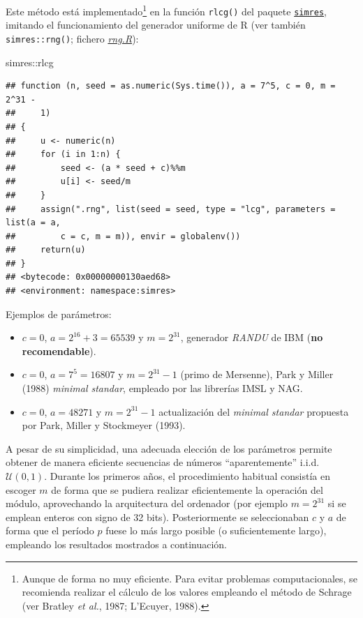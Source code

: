\documentclass[
]{book}
\newenvironment{Shaded}{\begin{snugshade}}{\end{snugshade}}
\newcommand{\NormalTok}[1]{#1}
\newcommand{\SpecialCharTok}[1]{\textcolor[rgb]{0.00,0.00,0.00}{#1}}
\theoremstyle{break}
\theoremstyle{nonumberplain}
\begin{document}
Este método está implementado\footnote{Aunque de forma no muy eficiente. Para evitar problemas computacionales, se recomienda realizar el cálculo de los valores empleando el método de Schrage (ver Bratley \emph{et al.}, 1987; L'Ecuyer, 1988).} en la función \texttt{rlcg()} del paquete \href{https://rubenfcasal.github.io/simres}{\texttt{simres}}, imitando el funcionamiento del generador uniforme de R (ver también \texttt{simres::rng()}; fichero \href{R/rng.R}{\emph{rng.R}}):

\begin{Shaded}
\begin{Highlighting}[]
\NormalTok{simres}\SpecialCharTok{::}\NormalTok{rlcg}
\end{Highlighting}
\end{Shaded}

\begin{verbatim}
## function (n, seed = as.numeric(Sys.time()), a = 7^5, c = 0, m = 2^31 - 
##     1) 
## {
##     u <- numeric(n)
##     for (i in 1:n) {
##         seed <- (a * seed + c)%%m
##         u[i] <- seed/m
##     }
##     assign(".rng", list(seed = seed, type = "lcg", parameters = list(a = a, 
##         c = c, m = m)), envir = globalenv())
##     return(u)
## }
## <bytecode: 0x00000000130aed68>
## <environment: namespace:simres>
\end{verbatim}

Ejemplos de parámetros:

\begin{itemize}
\item
  \(c=0\), \(a=2^{16}+3=65539\) y \(m=2^{31}\), generador \emph{RANDU} de IBM
  (\textbf{no recomendable}).
\item
  \(c=0\), \(a=7^{5}=16807\) y \(m=2^{31}-1\) (primo de Mersenne), Park y Miller (1988)
  \emph{minimal standar}, empleado por las librerías IMSL y NAG.
\item
  \(c=0\), \(a=48271\) y \(m=2^{31}-1\) actualización del \emph{minimal standar}
  propuesta por Park, Miller y Stockmeyer (1993).
\end{itemize}

A pesar de su simplicidad, una adecuada elección de los parámetros permite obtener de manera eficiente secuencias de números ``aparentemente'' i.i.d. \(\mathcal{U}(0,1)\).
Durante los primeros años, el procedimiento habitual consistía en escoger \(m\) de forma que se pudiera realizar eficientemente la operación del módulo, aprovechando la arquitectura del ordenador (por ejemplo \(m = 2^{31}\) si se emplean enteros con signo de 32 bits).
Posteriormente se seleccionaban \(c\) y \(a\) de forma que el período \(p\) fuese lo más largo posible (o suficientemente largo), empleando los resultados mostrados a continuación.
\end{document}

